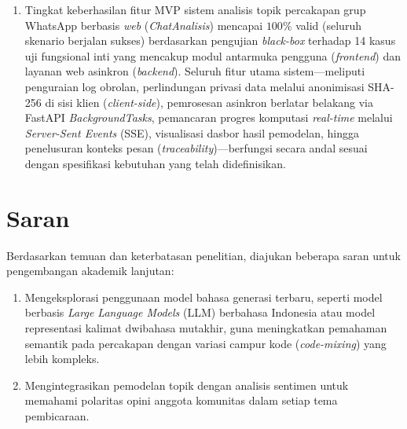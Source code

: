 \begin{enumerate}
    \item Tingkat keberhasilan fitur MVP sistem analisis topik percakapan grup WhatsApp berbasis \textit{web} (\textit{ChatAnalisis}) mencapai $100\%$ valid (seluruh skenario berjalan sukses) berdasarkan pengujian \textit{black-box} terhadap 14 kasus uji fungsional inti yang mencakup modul antarmuka pengguna (\textit{frontend}) dan layanan web asinkron (\textit{backend}). Seluruh fitur utama sistem—meliputi penguraian log obrolan, perlindungan privasi data melalui anonimisasi SHA-256 di sisi klien (\textit{client-side}), pemrosesan asinkron berlatar belakang via FastAPI \textit{BackgroundTasks}, pemancaran progres komputasi \textit{real-time} melalui \textit{Server-Sent Events} (SSE), visualisasi dasbor hasil pemodelan, hingga penelusuran konteks pesan (\textit{traceability})—berfungsi secara andal sesuai dengan spesifikasi kebutuhan yang telah didefinisikan.
\end{enumerate}

\section{Saran}
\label{sec:recommendations}

Berdasarkan temuan dan keterbatasan penelitian, diajukan beberapa saran untuk pengembangan akademik lanjutan:

\begin{enumerate}[nosep]
    \item Mengeksplorasi penggunaan model bahasa generasi terbaru, seperti model berbasis \textit{Large Language Models} (LLM) berbahasa Indonesia atau model representasi kalimat dwibahasa mutakhir, guna meningkatkan pemahaman semantik pada percakapan dengan variasi campur kode (\textit{code-mixing}) yang lebih kompleks.
    \item Mengintegrasikan pemodelan topik dengan analisis sentimen untuk memahami polaritas opini anggota komunitas dalam setiap tema pembicaraan.
\end{enumerate}
